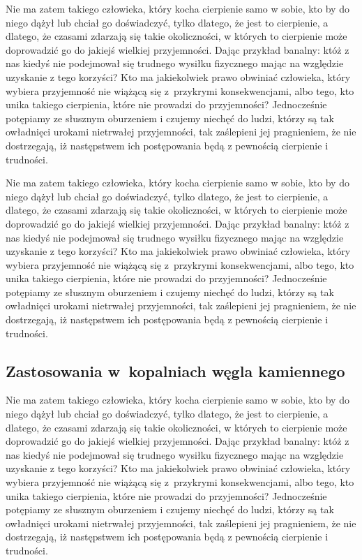 \documentclass[12pt]{mwbk}
\theoremstyle{plain}
\theoremstyle{definition}
\theoremstyle{remark}
\begin{document}
Nie ma zatem takiego człowieka, który kocha cierpienie samo w sobie, 
kto by do niego dążył lub chciał go doświadczyć, tylko dlatego, że
jest to cierpienie, a dlatego, że czasami zdarzają się takie 
okoliczności, w których to cierpienie może doprowadzić 
go do jakiejś wielkiej przyjemności. 
Dając przykład banalny: któż z nas kiedyś nie podejmował 
się trudnego wysiłku fizycznego mając na względzie 
uzyskanie z tego korzyści? 
Kto ma jakiekolwiek prawo obwiniać człowieka, 
który wybiera przyjemność nie wiążącą się z~przykrymi 
konsekwencjami, albo tego, kto unika takiego cierpienia, 
które nie prowadzi do przyjemności? 
Jednocześnie potępiamy ze słusznym oburzeniem i czujemy 
niechęć do ludzi, którzy są tak owładnięci urokami nietrwałej 
przyjemności, tak zaślepieni jej pragnieniem, 
że nie dostrzegają, iż następstwem ich 
postępowania będą z pewnością cierpienie i trudności.

Nie ma zatem takiego człowieka, który kocha cierpienie samo w sobie, 
kto by do niego dążył lub chciał go doświadczyć, tylko dlatego, że
jest to cierpienie, a dlatego, że czasami zdarzają się takie 
okoliczności, w których to cierpienie może doprowadzić 
go do jakiejś wielkiej przyjemności. 
Dając przykład banalny: któż z nas kiedyś nie podejmował 
się trudnego wysiłku fizycznego mając na względzie 
uzyskanie z tego korzyści? 
Kto ma jakiekolwiek prawo obwiniać człowieka, 
który wybiera przyjemność nie wiążącą się z~przykrymi 
konsekwencjami, albo tego, kto unika takiego cierpienia, 
które nie prowadzi do przyjemności? 
Jednocześnie potępiamy ze słusznym oburzeniem i czujemy 
niechęć do ludzi, którzy są tak owładnięci urokami nietrwałej 
przyjemności, tak zaślepieni jej pragnieniem, 
że nie dostrzegają, iż następstwem ich 
postępowania będą z pewnością cierpienie i trudności.

\subsection{Zastosowania w~kopalniach węgla kamiennego}
Nie ma zatem takiego człowieka, który kocha cierpienie samo w sobie, 
kto by do niego dążył lub chciał go doświadczyć, tylko dlatego, że
jest to cierpienie, a dlatego, że czasami zdarzają się takie 
okoliczności, w których to cierpienie może doprowadzić 
go do jakiejś wielkiej przyjemności. 
Dając przykład banalny: któż z nas kiedyś nie podejmował 
się trudnego wysiłku fizycznego mając na względzie 
uzyskanie z tego korzyści? 
Kto ma jakiekolwiek prawo obwiniać człowieka, 
który wybiera przyjemność nie wiążącą się z~przykrymi 
konsekwencjami, albo tego, kto unika takiego cierpienia, 
które nie prowadzi do przyjemności? 
Jednocześnie potępiamy ze słusznym oburzeniem i czujemy 
niechęć do ludzi, którzy są tak owładnięci urokami nietrwałej 
przyjemności, tak zaślepieni jej pragnieniem, 
że nie dostrzegają, iż następstwem ich 
postępowania będą z pewnością cierpienie i trudności.
\end{document}
